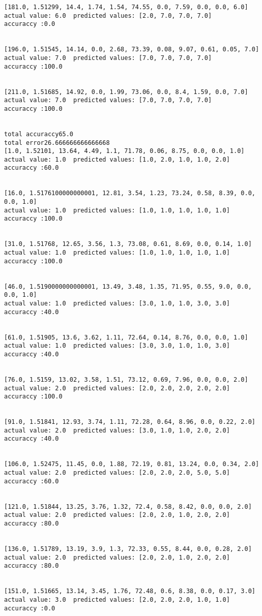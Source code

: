\documentclass[11pt]{article}
\begin{document}
\begin{Verbatim}[commandchars=\\\{\}]
[181.0, 1.51299, 14.4, 1.74, 1.54, 74.55, 0.0, 7.59, 0.0, 0.0, 6.0]
actual value: 6.0  predicted values: [2.0, 7.0, 7.0, 7.0]
accuraccy :0.0


[196.0, 1.51545, 14.14, 0.0, 2.68, 73.39, 0.08, 9.07, 0.61, 0.05, 7.0]
actual value: 7.0  predicted values: [7.0, 7.0, 7.0, 7.0]
accuraccy :100.0


[211.0, 1.51685, 14.92, 0.0, 1.99, 73.06, 0.0, 8.4, 1.59, 0.0, 7.0]
actual value: 7.0  predicted values: [7.0, 7.0, 7.0, 7.0]
accuraccy :100.0


total accuraccy65.0
total error26.666666666666668
[1.0, 1.52101, 13.64, 4.49, 1.1, 71.78, 0.06, 8.75, 0.0, 0.0, 1.0]
actual value: 1.0  predicted values: [1.0, 2.0, 1.0, 1.0, 2.0]
accuraccy :60.0


[16.0, 1.5176100000000001, 12.81, 3.54, 1.23, 73.24, 0.58, 8.39, 0.0, 0.0, 1.0]
actual value: 1.0  predicted values: [1.0, 1.0, 1.0, 1.0, 1.0]
accuraccy :100.0


[31.0, 1.51768, 12.65, 3.56, 1.3, 73.08, 0.61, 8.69, 0.0, 0.14, 1.0]
actual value: 1.0  predicted values: [1.0, 1.0, 1.0, 1.0, 1.0]
accuraccy :100.0


[46.0, 1.5190000000000001, 13.49, 3.48, 1.35, 71.95, 0.55, 9.0, 0.0, 0.0, 1.0]
actual value: 1.0  predicted values: [3.0, 1.0, 1.0, 3.0, 3.0]
accuraccy :40.0


[61.0, 1.51905, 13.6, 3.62, 1.11, 72.64, 0.14, 8.76, 0.0, 0.0, 1.0]
actual value: 1.0  predicted values: [3.0, 3.0, 1.0, 1.0, 3.0]
accuraccy :40.0


[76.0, 1.5159, 13.02, 3.58, 1.51, 73.12, 0.69, 7.96, 0.0, 0.0, 2.0]
actual value: 2.0  predicted values: [2.0, 2.0, 2.0, 2.0, 2.0]
accuraccy :100.0


[91.0, 1.51841, 12.93, 3.74, 1.11, 72.28, 0.64, 8.96, 0.0, 0.22, 2.0]
actual value: 2.0  predicted values: [3.0, 1.0, 1.0, 2.0, 2.0]
accuraccy :40.0


[106.0, 1.52475, 11.45, 0.0, 1.88, 72.19, 0.81, 13.24, 0.0, 0.34, 2.0]
actual value: 2.0  predicted values: [2.0, 2.0, 2.0, 5.0, 5.0]
accuraccy :60.0


[121.0, 1.51844, 13.25, 3.76, 1.32, 72.4, 0.58, 8.42, 0.0, 0.0, 2.0]
actual value: 2.0  predicted values: [2.0, 2.0, 1.0, 2.0, 2.0]
accuraccy :80.0


[136.0, 1.51789, 13.19, 3.9, 1.3, 72.33, 0.55, 8.44, 0.0, 0.28, 2.0]
actual value: 2.0  predicted values: [2.0, 2.0, 1.0, 2.0, 2.0]
accuraccy :80.0


[151.0, 1.51665, 13.14, 3.45, 1.76, 72.48, 0.6, 8.38, 0.0, 0.17, 3.0]
actual value: 3.0  predicted values: [2.0, 2.0, 2.0, 1.0, 1.0]
accuraccy :0.0



\end{Verbatim}
\end{document}
